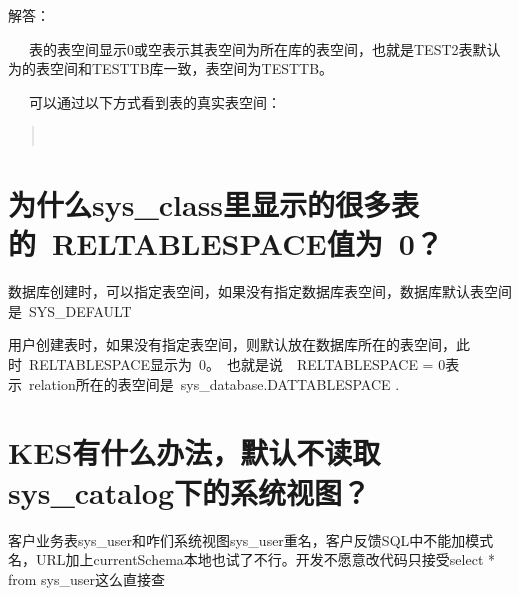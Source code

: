 \documentclass[a4,10pt,oneside,english]{sphinxmanual}
\begin{document}
解答：

   表的表空间显示0或空表示其表空间为所在库的表空间，也就是TEST2表默认为的表空间和TESTTB库一致，表空间为TESTTB。

   可以通过以下方式看到表的真实表空间：
\begin{quote}

\begin{sphinxVerbatim}[commandchars=\\\{\}]

   
 
\end{sphinxVerbatim}
\end{quote}


\section{为什么sys\_class里显示的很多表的 RELTABLESPACE值为 0？}
\label{\detokenize{system-management:sys-class-reltablespace-0}}
数据库创建时，可以指定表空间，如果没有指定数据库表空间，数据库默认表空间是 SYS\_DEFAULT

用户创建表时，如果没有指定表空间，则默认放在数据库所在的表空间，此时 RELTABLESPACE显示为 0。 也就是说  RELTABLESPACE = 0表示 relation所在的表空间是 sys\_database.DATTABLESPACE .


\section{KES有什么办法，默认不读取sys\_catalog下的系统视图？}
\label{\detokenize{system-management:kes-sys-catalog}}
客户业务表sys\_user和咋们系统视图sys\_user重名，客户反馈SQL中不能加模式名，URL加上currentSchema本地也试了不行。开发不愿意改代码只接受select * from sys\_user这么直接查
\end{document}
